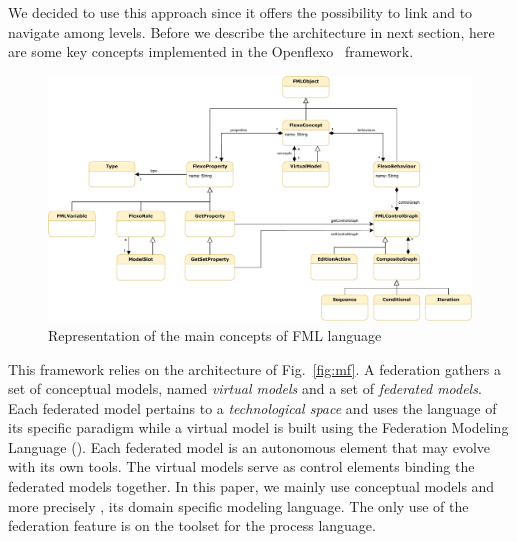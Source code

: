 We decided to use this approach since it offers the possibility to
link and to navigate among levels. Before we describe the 
architecture in next section, here are some key concepts implemented
in the Openflexo~\parencite{openflexo_link} framework.



\begin{figure}
    \centering
    \includegraphics[width=0.95 \textwidth]{Figures/FMLMetaModel-1.5.pdf}
    \caption{Representation of the main concepts of {FML} language}
    \label{fig:mm}
\end{figure}

This framework relies on the architecture of Fig.~\ref{fig:mf}. A federation
gathers a set of conceptual models, named \emph{virtual models} and a set of
\emph{federated models}. Each federated model pertains to a \emph{technological
space} and uses the language of its specific paradigm while a virtual model is
built using the Federation Modeling Language (\FML). Each federated model is an
autonomous element that may evolve with its own tools. The virtual models serve
as control elements binding the federated models together.  In this paper, we
mainly use conceptual models and more precisely \FML, its domain specific
modeling language. The only use of the federation feature is on the toolset for
the process language.

